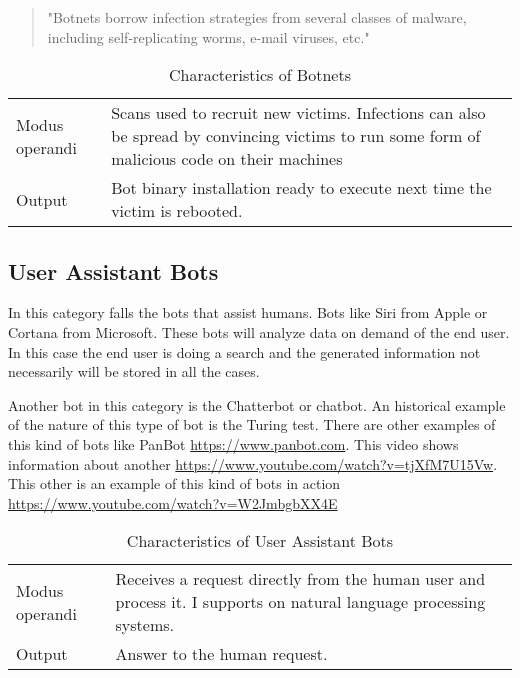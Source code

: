 \documentclass[runningheads,a4paper]{llncs}
\begin{document}
    \begin{quote}
        "Botnets borrow infection strategies from several classes of malware, including self-replicating worms, e-mail viruses, etc."
    \end{quote}
    
    \begin{table}
        \caption{Characteristics of Botnets}
        \begin{tabular}{p{3cm} p{9cm}}
        \hline
        Modus operandi &  Scans used to recruit new victims. Infections can also be spread by convincing victims to run some form
            of malicious code on their machines\\ 
        Output                &  Bot binary installation ready to execute next time the victim is rebooted. \\
        \hline
        \end{tabular}
        \label{tab:botnetb}
    \end{table}
    
\subsection{User Assistant Bots}
    In this category falls the bots that assist humans. Bots like Siri from Apple or Cortana from Microsoft. These bots will analyze data on demand of the
    end user. In this case the end user is doing a search and the generated information not necessarily will be stored in all the cases.
    
    Another bot in this category is the Chatterbot or chatbot. An historical example of the nature of this type of bot is the Turing test. There are other 
    examples of this kind of bots like PanBot \url{https://www.panbot.com}. This video shows information about another \url{https://www.youtube.com/watch?v=tjXfM7U15Vw}. This other is an example of this kind of bots in action \url{https://www.youtube.com/watch?v=W2JmbgbXX4E}
    
    \begin{table}
        \caption{Characteristics of User Assistant Bots}
        \begin{tabular}{p{3cm} p{9cm}}
        \hline
        Modus operandi &  Receives a request directly from the human user and process it. I supports on natural language processing systems.  \\ 
        Output                &  Answer to the human request. \\
        \hline
        \end{tabular}
        \label{tab:botnetb}
    \end{table}
    
\end{document}
